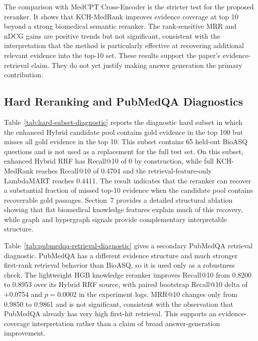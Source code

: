 

The comparison with MedCPT Cross-Encoder is the stricter test for the proposed reranker. It shows that KCH-MedRank improves evidence coverage at top 10 beyond a strong biomedical semantic reranker. The rank-sensitive MRR and nDCG gains are positive trends but not significant, consistent with the interpretation that the method is particularly effective at recovering additional relevant evidence into the top-10 set. These results support the paper's evidence-retrieval claim. They do not yet justify making answer generation the primary contribution.

\subsection{Hard Reranking and PubMedQA Diagnostics}

Table~\ref{tab:hard-subset-diagnostic} reports the diagnostic hard subset in which the enhanced Hybrid candidate pool contains gold evidence in the top 100 but misses all gold evidence in the top 10. This subset contains 65 held-out BioASQ questions and is not used as a replacement for the full test set. On this subset, enhanced Hybrid RRF has Recall@10 of 0 by construction, while full KCH-MedRank reaches Recall@10 of 0.4704 and the retrieval-feature-only LambdaMART reaches 0.4411. The result indicates that the reranker can recover a substantial fraction of missed top-10 evidence when the candidate pool contains recoverable gold passages. Section~7 provides a detailed structural ablation showing that flat biomedical knowledge features explain much of this recovery, while graph and hypergraph signals provide complementary interpretable structure.



Table~\ref{tab:pubmedqa-retrieval-diagnostic} gives a secondary PubMedQA retrieval diagnostic. PubMedQA has a different evidence structure and much stronger first-rank retrieval behavior than BioASQ, so it is used only as a robustness check. The lightweight HGB knowledge reranker improves Recall@10 from 0.8200 to 0.8953 over its Hybrid RRF source, with paired bootstrap Recall@10 delta of +0.0754 and $p=0.0002$ in the experiment logs. MRR@10 changes only from 0.9850 to 0.9861 and is not significant, consistent with the observation that PubMedQA already has very high first-hit retrieval. This supports an evidence-coverage interpretation rather than a claim of broad answer-generation improvement.


